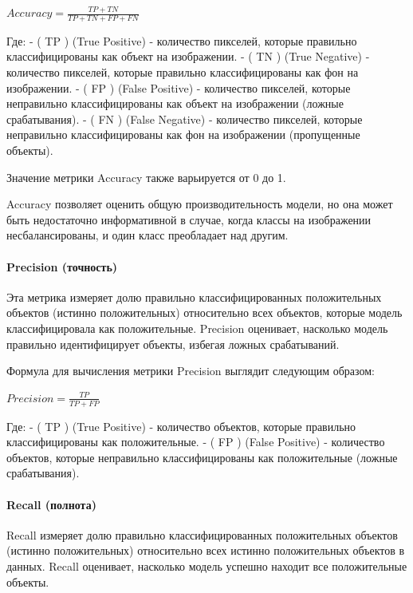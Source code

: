 \documentclass[11pt]{article}
\begin{document}
\(Accuracy = \frac{TP + TN}{TP + TN + FP + FN}\)

Где: - ( TP ) (True Positive) - количество пикселей, которые правильно
классифицированы как объект на изображении. - ( TN ) (True Negative) -
количество пикселей, которые правильно классифицированы как фон на
изображении. - ( FP ) (False Positive) - количество пикселей, которые
неправильно классифицированы как объект на изображении (ложные
срабатывания). - ( FN ) (False Negative) - количество пикселей, которые
неправильно классифицированы как фон на изображении (пропущенные
объекты).

Значение метрики Accuracy также варьируется от 0 до 1.

Accuracy позволяет оценить общую производительность модели, но она может
быть недостаточно информативной в случае, когда классы на изображении
несбалансированы, и один класс преобладает над другим.

    \hypertarget{precision-ux442ux43eux447ux43dux43eux441ux442ux44c}{%
\paragraph{Precision
(точность)}\label{precision-ux442ux43eux447ux43dux43eux441ux442ux44c}}

Эта метрика измеряет долю правильно классифицированных положительных
объектов (истинно положительных) относительно всех объектов, которые
модель классифицировала как положительные. Precision оценивает,
насколько модель правильно идентифицирует объекты, избегая ложных
срабатываний.

Формула для вычисления метрики Precision выглядит следующим образом:

\(Precision = \frac{TP}{TP + FP}\)

Где: - ( TP ) (True Positive) - количество объектов, которые правильно
классифицированы как положительные. - ( FP ) (False Positive) -
количество объектов, которые неправильно классифицированы как
положительные (ложные срабатывания).

\hypertarget{recall-ux43fux43eux43bux43dux43eux442ux430}{%
\paragraph{Recall
(полнота)}\label{recall-ux43fux43eux43bux43dux43eux442ux430}}

Recall измеряет долю правильно классифицированных положительных объектов
(истинно положительных) относительно всех истинно положительных объектов
в данных. Recall оценивает, насколько модель успешно находит все
положительные объекты.
\end{document}

